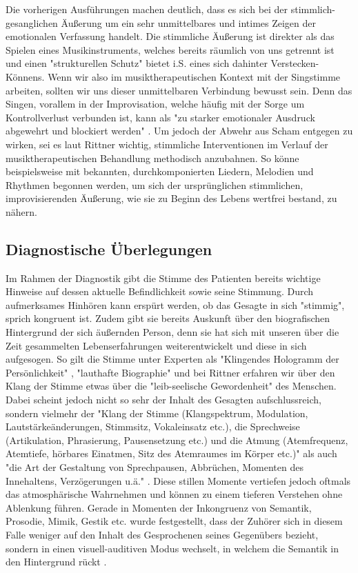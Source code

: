 Die vorherigen Ausführungen machen deutlich, dass es sich bei der stimmlich-gesanglichen Äußerung um ein sehr unmittelbares und intimes Zeigen der emotionalen Verfassung handelt. Die stimmliche Äußerung ist direkter als das Spielen eines Musikinstruments, welches bereits räumlich von uns getrennt ist und einen "strukturellen Schutz" \autocite[110]{rittner1990} bietet i.S. eines sich dahinter Verstecken-Könnens. Wenn wir also im musiktherapeutischen Kontext mit der Singstimme arbeiten, sollten wir uns dieser unmittelbaren Verbindung bewusst sein. Denn das Singen, vorallem in der Improvisation, welche häufig mit der Sorge um Kontrollverlust verbunden ist, kann als "zu starker emotionaler Ausdruck abgewehrt und blockiert werden" \autocite[485]{rittner2009a}. Um jedoch der Abwehr aus Scham entgegen zu wirken, sei es laut Rittner wichtig, stimmliche Interventionen im Verlauf der musiktherapeutischen Behandlung methodisch anzubahnen. So könne beispielsweise mit bekannten, durchkomponierten Liedern, Melodien und Rhythmen begonnen werden, um sich der ursprünglichen stimmlichen, improvisierenden Äußerung, wie sie zu Beginn des Lebens wertfrei bestand, zu nähern. 

\subsection{Diagnostische Überlegungen}
Im Rahmen der Diagnostik gibt die Stimme des Patienten bereits wichtige Hinweise auf dessen aktuelle Befindlichkeit sowie seine Stimmung. Durch aufmerksames Hinhören kann erspürt werden, ob das Gesagte in sich "stimmig", sprich kongruent ist. Zudem gibt sie bereits Auskunft über den biografischen Hintergrund der sich äußernden Person, denn sie hat sich mit unseren über die Zeit gesammelten Lebenserfahrungen weiterentwickelt und diese in sich aufgesogen. So gilt die Stimme unter Experten als "Klingendes Hologramm der Persönlichkeit" \autocite{adamek1999}, "lauthafte Biographie" \autocite{gundermann1994} und bei Rittner erfahren wir über den Klang der Stimme etwas über die "leib-seelische Gewordenheit" \autocite[211]{rittner2008} des Menschen.
Dabei scheint jedoch nicht so sehr der Inhalt des Gesagten aufschlussreich, sondern vielmehr der "Klang der Stimme (Klangspektrum, Modulation, Lautstärkeänderungen, Stimmsitz, Vokaleinsatz etc.), die Sprechweise (Artikulation, Phrasierung, Pausensetzung etc.) und die Atmung (Atemfrequenz, Atemtiefe, hörbares Einatmen, Sitz des Atemraumes im Körper etc.)" als auch "die Art der Gestaltung von Sprechpausen, Abbrüchen, Momenten des Innehaltens, Verzögerungen u.ä." \autocite[210]{rittner2008}. Diese stillen Momente vertiefen jedoch oftmals das atmosphärische Wahrnehmen und können zu einem tieferen Verstehen ohne Ablenkung führen. 
Gerade in Momenten der Inkongruenz von Semantik, Prosodie, Mimik, Gestik etc. wurde festgestellt, dass der Zuhörer sich in diesem Falle weniger auf den Inhalt des Gesprochenen seines Gegenübers bezieht, sondern in einen visuell-auditiven Modus wechselt, in welchem die Semantik in den Hintergrund rückt \autocite [vgl.][206f.]{rittner2008}.

